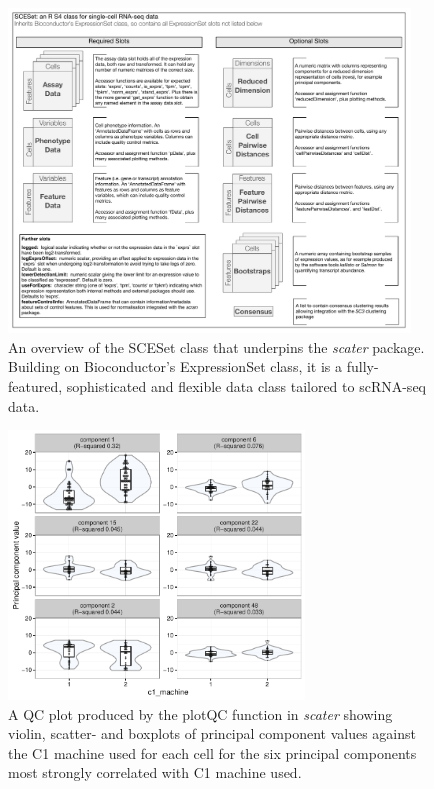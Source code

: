 \documentclass{revtex4}
\begin{document}
\begin{figure}[!tpb]%
\centerline{\includegraphics[width=0.95\textwidth]{figures/sceset_outline.pdf}}
\caption{An overview of the SCESet class that underpins the \emph{scater} package. Building on Bioconductor's ExpressionSet class, it is a fully-featured, sophisticated and flexible data class tailored to scRNA-seq data.}\label{fig:02}
\end{figure}


\begin{figure}[!tpb]
\centerline{\includegraphics[width=0.7\textwidth]{figures/find-pcs_c1_machine.pdf}}
\caption{A QC plot produced by the plotQC function in \emph{scater} showing violin, scatter- and boxplots of principal component values against the C1 machine used for each cell for the six principal components most strongly correlated with C1 machine used.}\label{fig:plotqc-c1-machine}
\end{figure}
\end{document}
